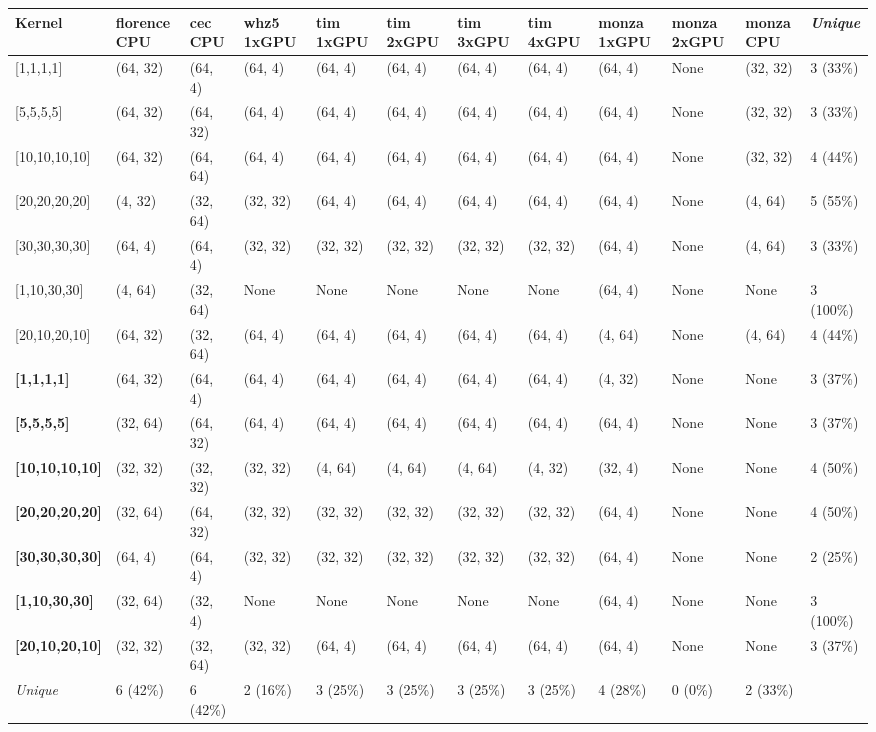 \begin{tabular}{|p{1.8cm} | p{1cm} | p{1cm} | p{1cm} | p{1cm} | p{1cm} | p{1cm} | p{1cm} | p{1cm} | p{1cm} | p{1cm} | p{1.1cm}|}
\hline
\textbf{Kernel} & \textbf{florence CPU} & \textbf{cec CPU} & \textbf{whz5 1xGPU} & \textbf{tim 1xGPU} & \textbf{tim 2xGPU} & \textbf{tim 3xGPU} & \textbf{tim 4xGPU} & \textbf{monza 1xGPU} & \textbf{monza 2xGPU} & \textbf{monza CPU} & \textit{Unique}\\
\hline
{[}1,1,1,1{]} & (64, 32) & (64, 4) & (64, 4) & (64, 4) & (64, 4) & (64, 4) & (64, 4) & (64, 4) & None & (32, 32) & 3 (33\%)\\
{[}5,5,5,5{]} & (64, 32) & (64, 32) & (64, 4) & (64, 4) & (64, 4) & (64, 4) & (64, 4) & (64, 4) & None & (32, 32) & 3 (33\%)\\
{[}10,10,10,10{]} & (64, 32) & (64, 64) & (64, 4) & (64, 4) & (64, 4) & (64, 4) & (64, 4) & (64, 4) & None & (32, 32) & 4 (44\%)\\
{[}20,20,20,20{]} & (4, 32) & (32, 64) & (32, 32) & (64, 4) & (64, 4) & (64, 4) & (64, 4) & (64, 4) & None & (4, 64) & 5 (55\%)\\
{[}30,30,30,30{]} & (64, 4) & (64, 4) & (32, 32) & (32, 32) & (32, 32) & (32, 32) & (32, 32) & (64, 4) & None & (4, 64) & 3 (33\%)\\
{[}1,10,30,30{]} & (4, 64) & (32, 64) & None & None & None & None & None & (64, 4) & None & None & 3 (100\%)\\
{[}20,10,20,10{]} & (64, 32) & (32, 64) & (64, 4) & (64, 4) & (64, 4) & (64, 4) & (64, 4) & (4, 64) & None & (4, 64) & 4 (44\%)\\
\textbf{{[}1,1,1,1{]}} & (64, 32) & (64, 4) & (64, 4) & (64, 4) & (64, 4) & (64, 4) & (64, 4) & (4, 32) & None & None & 3 (37\%)\\
\textbf{{[}5,5,5,5{]}} & (32, 64) & (64, 32) & (64, 4) & (64, 4) & (64, 4) & (64, 4) & (64, 4) & (64, 4) & None & None & 3 (37\%)\\
\textbf{{[}10,10,10,10{]}} & (32, 32) & (32, 32) & (32, 32) & (4, 64) & (4, 64) & (4, 64) & (4, 32) & (32, 4) & None & None & 4 (50\%)\\
\textbf{{[}20,20,20,20{]}} & (32, 64) & (64, 32) & (32, 32) & (32, 32) & (32, 32) & (32, 32) & (32, 32) & (64, 4) & None & None & 4 (50\%)\\
\textbf{{[}30,30,30,30{]}} & (64, 4) & (64, 4) & (32, 32) & (32, 32) & (32, 32) & (32, 32) & (32, 32) & (64, 4) & None & None & 2 (25\%)\\
\textbf{{[}1,10,30,30{]}} & (32, 64) & (32, 4) & None & None & None & None & None & (64, 4) & None & None & 3 (100\%)\\
\textbf{{[}20,10,20,10{]}} & (32, 32) & (32, 64) & (32, 32) & (64, 4) & (64, 4) & (64, 4) & (64, 4) & (64, 4) & None & None & 3 (37\%)\\
\hline
\textit{Unique} & 6 (42\%) & 6 (42\%) & 2 (16\%) & 3 (25\%) & 3 (25\%) & 3 (25\%) & 3 (25\%) & 4 (28\%) & 0 (0\%) & 2 (33\%) & \\
\hline
\end{tabular}
